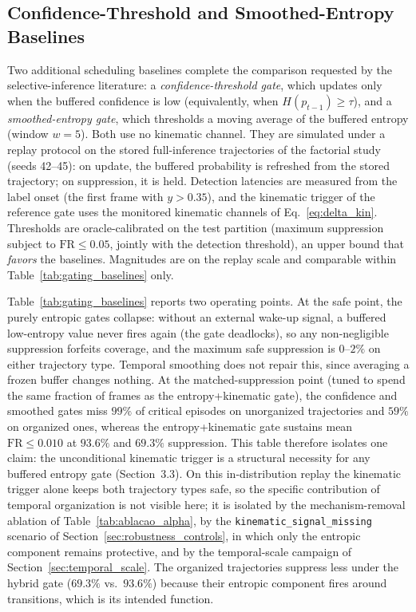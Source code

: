 \documentclass[a4paper,fleqn]{cas-dc}
\begin{document}
{\color{\revcolor}
\subsection{Confidence-Threshold and Smoothed-Entropy Baselines}
\label{sec:gating_baselines}
Two additional scheduling baselines complete the comparison requested by the
selective-inference literature: a \emph{confidence-threshold gate}, which
updates only when the buffered confidence is low (equivalently, when
$H(p_{t-1}) \ge \tau$), and a \emph{smoothed-entropy gate}, which thresholds a
moving average of the buffered entropy (window $w{=}5$). Both use no kinematic
channel. They are simulated under a replay protocol on the stored
full-inference trajectories of the factorial study (seeds 42--45): on update,
the buffered probability is refreshed from the stored trajectory; on
suppression, it is held. Detection latencies are measured from the label
onset (the first frame with $y > 0.35$), and the kinematic trigger of the
reference gate uses the monitored kinematic channels of
Eq.~\ref{eq:delta_kin}. Thresholds are oracle-calibrated on the test
partition (maximum suppression subject to $\mathrm{FR} \le 0.05$, jointly with
the detection threshold), an upper bound that \emph{favors} the baselines.
Magnitudes are on the replay scale and comparable within
Table~\ref{tab:gating_baselines} only.

Table~\ref{tab:gating_baselines} reports two operating points. At the safe
point, the purely entropic gates collapse: without an external wake-up signal,
a buffered low-entropy value never fires again (the gate deadlocks), so any
non-negligible suppression forfeits coverage, and the maximum safe suppression
is $0$--$2\%$ on either trajectory type. Temporal smoothing does not repair
this, since averaging a frozen buffer changes nothing. At the
matched-suppression point (tuned to spend the same fraction of frames as the
entropy+kinematic gate), the confidence and smoothed gates miss
$99\%$ of critical episodes on unorganized trajectories and $59\%$ on
organized ones, whereas the entropy+kinematic gate sustains mean
$\mathrm{FR} \le 0.010$ at $93.6\%$ and $69.3\%$ suppression. This table
therefore isolates one claim: the unconditional kinematic trigger is a
structural necessity for any buffered entropy gate (Section~3.3). On this
in-distribution replay the kinematic trigger alone keeps both trajectory
types safe, so the specific contribution of temporal organization is not
visible here; it is isolated by the mechanism-removal ablation of
Table~\ref{tab:ablacao_alpha}, by the
\texttt{kinematic\_\allowbreak signal\_\allowbreak missing} scenario of
Section~\ref{sec:robustness_controls}, in which only the entropic component
remains protective, and by the temporal-scale campaign of
Section~\ref{sec:temporal_scale}. The organized trajectories suppress less
under the hybrid gate ($69.3\%$ vs.\ $93.6\%$) because their entropic component
fires around transitions, which is its intended function.

}
\end{document}
